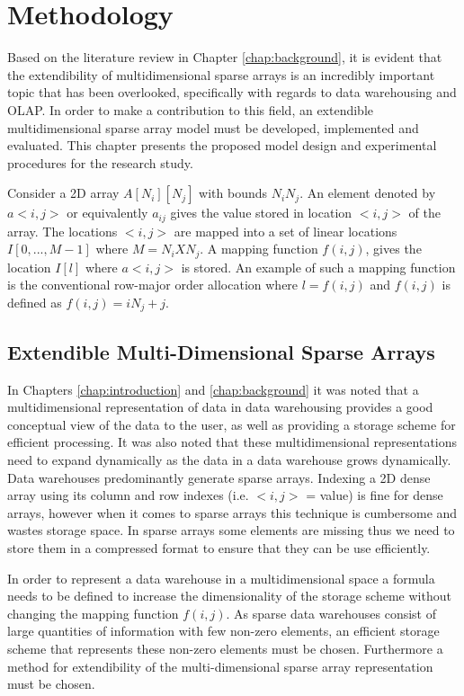 %
%
%
%   
%
%
\chapter{Methodology} \label{chap:methodology}
\vspace{-1cm}
Based on the literature review in Chapter \ref{chap:background}, it is evident that the extendibility of multidimensional sparse arrays is an incredibly important topic that has been overlooked, specifically with regards to data warehousing and OLAP. In order to make a contribution to this field, an extendible multidimensional sparse array model must be developed, implemented and evaluated. This chapter presents the proposed model design and experimental procedures for the research study.

Consider a 2D array $A[N_i][N_j]$ with bounds $N_i N_j$. An element denoted by $a<i,j>$ or equivalently $a_{ij}$ gives the value stored in location $<i,j>$ of the array. The locations $<i,j>$ are mapped into a set of linear locations $I[0, ..., M-1]$ where $M=N_i X N_j$. A mapping function $f(i,j)$, gives the location $I[l]$ where $a<i,j>$ is stored. An example of such a mapping function is the conventional row-major order allocation where $l=f(i,j)$ and $f(i,j)$ is defined as $f(i,j) = iN_j+j$.

\section{Extendible Multi-Dimensional Sparse Arrays}
In Chapters \ref{chap:introduction} and \ref{chap:background} it was noted that a multidimensional representation of data in data warehousing provides a good conceptual view of the data to the user, as well as providing a storage scheme for efficient processing. It was also noted that these multidimensional representations need to expand dynamically as the data in a data warehouse grows dynamically. Data warehouses predominantly generate sparse arrays. Indexing a 2D dense array using its column and row indexes (i.e. $<i,j>$ = value) is fine for dense arrays, however when it comes to sparse arrays this technique is cumbersome and wastes storage space. In sparse arrays some elements are missing thus we need to store them in a compressed format to ensure that they can be use efficiently.

In order to represent a data warehouse in a multidimensional space a formula needs to be defined to increase the dimensionality of the storage scheme without changing the mapping function $f(i,j)$. As sparse data warehouses consist of large quantities of information with few non-zero elements, an efficient storage scheme that represents these non-zero elements must be chosen. Furthermore a method for extendibility of the multi-dimensional sparse array representation must be chosen.

